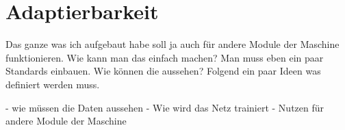 \chapter{Adaptierbarkeit}
Das ganze was ich aufgebaut habe soll ja auch für andere Module der Maschine funktionieren. Wie kann man das einfach
machen? Man muss eben ein paar Standards einbauen. Wie können die aussehen? Folgend ein paar Ideen was definiert werden
muss.

- wie müssen die Daten aussehen
- Wie wird das Netz trainiert
- Nutzen für andere Module der Maschine